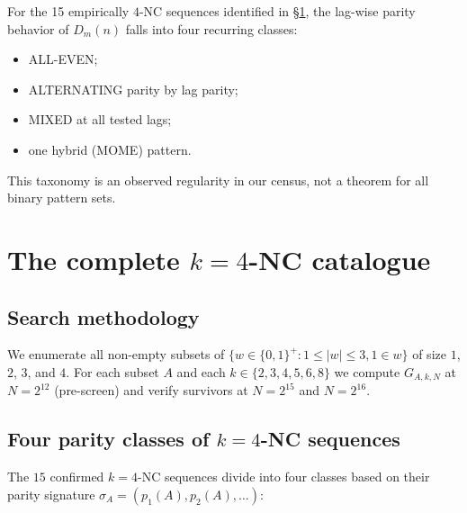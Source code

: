 \documentclass[11pt]{article}
\theoremstyle{definition}
\theoremstyle{remark}
\begin{document}
For the 15 empirically $4$-NC sequences identified in
\S\ref{sec:k4nc}, the lag-wise parity behavior of $D_m(n)$
falls into four recurring classes:
\begin{itemize}
  \item ALL-EVEN;
  \item ALTERNATING parity by lag parity;
  \item MIXED at all tested lags;
  \item one hybrid (MOME) pattern.
\end{itemize}
This taxonomy is an observed regularity in our census, not a theorem
for all binary pattern sets.

\section{The complete $k=4$-NC catalogue}
\label{sec:k4nc}

\subsection{Search methodology}

We enumerate all non-empty subsets of $\{w \in \{0,1\}^+ : 1 \leq |w| \leq 3,
1 \in w\}$ of size $1$, $2$, $3$, and $4$.  For each subset $A$ and
each $k \in \{2,3,4,5,6,8\}$ we compute $G_{A,k,N}$ at $N = 2^{12}$
(pre-screen) and verify survivors at $N = 2^{15}$ and $N = 2^{16}$.

\subsection{Four parity classes of $k=4$-NC sequences}

The $15$ confirmed $k=4$-NC sequences divide into four classes based
on their parity signature $\sigma_A = (p_1(A), p_2(A), \ldots)$:
\end{document}
